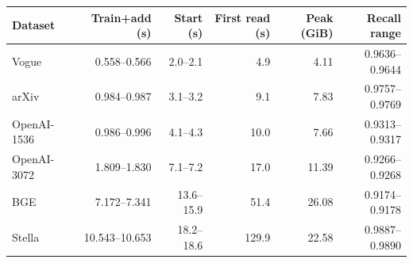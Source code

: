 \begin{tabular}{@{}lrrrrr@{}}
\toprule
Dataset & Train+add (s) & Start (s) & First read (s) & Peak (GiB) & Recall range \\
\midrule
Vogue & 0.558--0.566 & 2.0--2.1 & 4.9 & 4.11 & 0.9636--0.9644 \\
arXiv & 0.984--0.987 & 3.1--3.2 & 9.1 & 7.83 & 0.9757--0.9769 \\
OpenAI-1536 & 0.986--0.996 & 4.1--4.3 & 10.0 & 7.66 & 0.9313--0.9317 \\
OpenAI-3072 & 1.809--1.830 & 7.1--7.2 & 17.0 & 11.39 & 0.9266--0.9268 \\
BGE & 7.172--7.341 & 13.6--15.9 & 51.4 & 26.08 & 0.9174--0.9178 \\
Stella & 10.543--10.653 & 18.2--18.6 & 129.9 & 22.58 & 0.9887--0.9890 \\
\bottomrule
\end{tabular}
